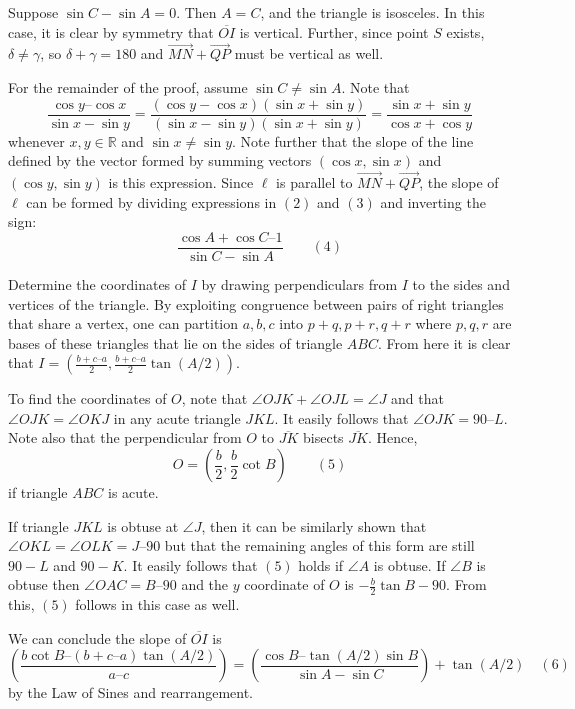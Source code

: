 \begin{enumerate}
 Suppose $\sin C - \sin A = 0$. Then $A = C$, and the triangle is isosceles. In this case, it is clear by symmetry that $\overline{OI}$ is vertical. Further, since point $S$ exists, $\delta \neq \gamma$, so $\delta + \gamma = 180$ and $\overrightarrow{MN} + \overrightarrow{QP}$ must be vertical as well.

 For the remainder of the proof, assume $\sin C \neq \sin A$. Note that 
 \[\frac{\cos y – \cos x}{\sin x - \sin y} = \frac{ (\cos y - \cos x)(\sin x + \sin y)}{ (\sin x - \sin y)(\sin x + \sin y)} = \frac {\sin x + \sin y}{\cos x + \cos y}\] whenever $x, y \in \mathbb{R}$ and $\sin x \neq \sin y$. Note further that the slope of the line defined by the vector formed by summing vectors $(\cos x, \sin x)$ and $(\cos y, \sin y)$ is this expression. Since $\ell$ is parallel to $\overrightarrow{MN} + \overrightarrow{QP}$, the slope of $\ell$ can be formed by dividing expressions in $(2)$ and $(3)$ and inverting the sign: 
 \[\frac{\cos A + \cos C – 1}{\sin C - \sin A} \qquad (4)\]

 Determine the coordinates of $I$ by drawing perpendiculars from $I$ to the sides and vertices of the triangle. By exploiting congruence between pairs of right triangles that share a vertex, one can partition $a,b,c$ into $p+q, p+r, q+r$ where $p,q,r$ are bases of these triangles that lie on the sides of triangle $ABC$. From here it is clear that $I = \left(\frac{b + c – a}{2} , \frac{b + c – a}{2}\tan(A / 2)\right)$.

 To find the coordinates of $O$, note that $\angle{OJK} + \angle{OJL} = \angle{J}$ and that $\angle {OJK} = \angle{OKJ}$ in any acute triangle $JKL$. It easily follows that $\angle{OJK} = 90 – L$. Note also that the perpendicular from $O$ to $\overline{JK}$ bisects $\overline{JK}$. Hence, 
 \[O = \left(\frac{b}{2},\frac{b}{2} \cot B\right) \qquad (5)\] if triangle $ABC$ is acute.

 If triangle $JKL$ is obtuse at $\angle J$, then it can be similarly shown that $\angle{OKL} = \angle{OLK} = J – 90$ but that the remaining angles of this form are still $90-L$ and $90-K$. It easily follows that $(5)$ holds if $\angle A$ is obtuse. If $\angle B$ is obtuse then $\angle OAC = B – 90$ and the $y$ coordinate of $O$ is $-\frac{b}{2} \tan{B-90}$. From this, $(5)$ follows in this case as well.

 We can conclude the slope of $\overline {OI}$ is 
 \[\left(\frac{b \cot {B} – (b + c – a) \tan(A/2)}{a – c}\right) = \left( \frac {\cos B – \tan{(A/2)}\sin B}{\sin A - \sin C}\right) + \tan(A/2)  \quad (6)\] by the Law of Sines and rearrangement.


\end{enumerate}
